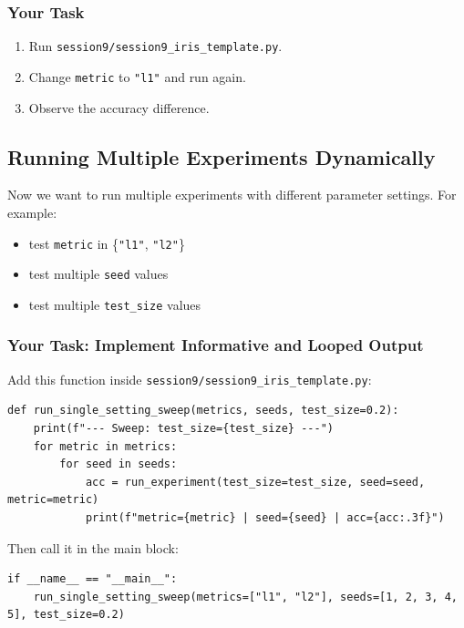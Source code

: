 \subsubsection{Your Task}
\begin{enumerate}\setlength{\itemsep}{2pt}
\item Run \texttt{session9/session9\_iris\_template.py}.
\item Change \texttt{metric} to \texttt{"l1"} and run again.
\item Observe the accuracy difference.
\end{enumerate}

\newpage
\subsection{Running Multiple Experiments Dynamically}

Now we want to run multiple experiments with different parameter settings.
For example:
\begin{itemize}\setlength{\itemsep}{0pt}
\item test \texttt{metric} in \{\texttt{"l1"}, \texttt{"l2"}\}
\item test multiple \texttt{seed} values
\item test multiple \texttt{test\_size} values
\end{itemize}

\subsubsection{Your Task: Implement Informative and Looped Output}
\label{subsubsec:activity_informative_loop_output}

Add this function inside \texttt{session9/session9\_iris\_template.py}:

\begin{verbatim}
def run_single_setting_sweep(metrics, seeds, test_size=0.2):
    print(f"--- Sweep: test_size={test_size} ---")
    for metric in metrics:
        for seed in seeds:
            acc = run_experiment(test_size=test_size, seed=seed, metric=metric)
            print(f"metric={metric} | seed={seed} | acc={acc:.3f}")
\end{verbatim}

\noindent
Then call it in the main block:
\begin{verbatim}
if __name__ == "__main__":
    run_single_setting_sweep(metrics=["l1", "l2"], seeds=[1, 2, 3, 4, 5], test_size=0.2)
\end{verbatim}

